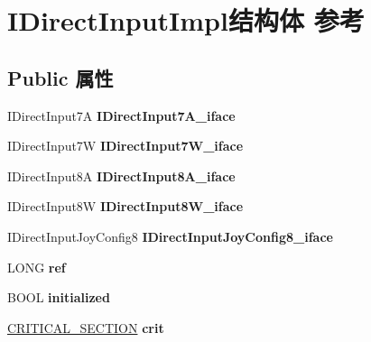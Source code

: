\hypertarget{struct_i_direct_input_impl}{}\section{I\+Direct\+Input\+Impl结构体 参考}
\label{struct_i_direct_input_impl}
\subsection*{Public 属性}
\begin{DoxyCompactItemize}
\item 
\mbox{\label{struct_i_direct_input_impl_a58bd3be5b13fec66da476b33aa3d7924}} 
I\+Direct\+Input7A {\bfseries I\+Direct\+Input7\+A\+\_\+iface}
\item 
\mbox{\label{struct_i_direct_input_impl_aaf9680e5683dcc13a692a38d5787748d}} 
I\+Direct\+Input7W {\bfseries I\+Direct\+Input7\+W\+\_\+iface}
\item 
\mbox{\label{struct_i_direct_input_impl_ac20edbc7eaa61d1ec4400ac0031e9eae}} 
I\+Direct\+Input8A {\bfseries I\+Direct\+Input8\+A\+\_\+iface}
\item 
\mbox{\label{struct_i_direct_input_impl_acdffe54646ebb99e863d8281d9a84691}} 
I\+Direct\+Input8W {\bfseries I\+Direct\+Input8\+W\+\_\+iface}
\item 
\mbox{\label{struct_i_direct_input_impl_a35f150d5bc0a9532d6a47af53a03e4fd}} 
I\+Direct\+Input\+Joy\+Config8 {\bfseries I\+Direct\+Input\+Joy\+Config8\+\_\+iface}
\item 
\mbox{\label{struct_i_direct_input_impl_a1a4744515dc35e9d65bc3ce3ab820284}} 
L\+O\+NG {\bfseries ref}
\item 
\mbox{\label{struct_i_direct_input_impl_a2f42946d7af3c7f84ffcf878f52cf56c}} 
B\+O\+OL {\bfseries initialized}
\item 
\mbox{\label{struct_i_direct_input_impl_a7e8e2e61074ce0635b33efdefc7ac716}} 
\hyperlink{struct___c_r_i_t_i_c_a_l___s_e_c_t_i_o_n}{C\+R\+I\+T\+I\+C\+A\+L\+\_\+\+S\+E\+C\+T\+I\+ON} {\bfseries crit}

\end{DoxyCompactItemize}

